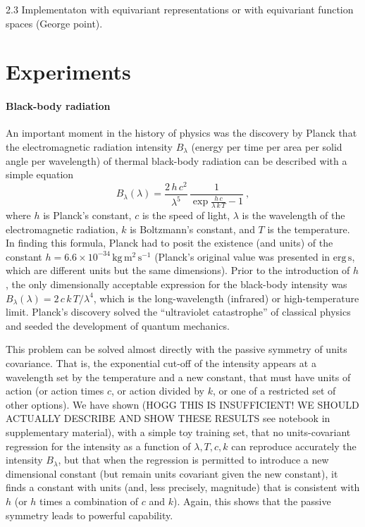 \documentclass{article}
\theoremstyle{plain}
\theoremstyle{definition}
\theoremstyle{remark}
\newcommand{\unit}[1]{\mathrm{#1}}
\newcommand{\kg}{\unit{kg}}
\newcommand{\m}{\unit{m}}
\newcommand{\s}{\unit{s}}
\begin{document}
   2.3 Implementaton with equivariant representations or with equivariant function spaces (George point).


\section{Experiments}\label{sec:experiments}

\paragraph{Black-body radiation}
An important moment in the history of physics was the discovery by Planck that the electromagnetic radiation intensity $B_\lambda$ (energy per time per area per solid angle per wavelength) of thermal black-body radiation can be described with a simple equation \cite{planck}
\begin{equation}
    B_\lambda(\lambda) = \frac{2\,h\,c^2}{\lambda^5}\,\frac{1}{\exp\frac{h\,c}{\lambda\,k\,T} - 1}~,
\end{equation}
where $h$ is Planck's constant,
$c$ is the speed of light,
$\lambda$ is the wavelength of the electromagnetic radiation,
$k$ is Boltzmann's constant,
and $T$ is the temperature.
In finding this formula, Planck had to posit the existence (and units) of the constant $h=6.6\times 10^{-34}\,\kg\,\m^2\,\s^{-1}$ (Planck's original value was presented in $\mathrm{erg}\,\s$, which are different units but the same dimensions).
Prior to the introduction of $h$, the only dimensionally acceptable expression for the black-body intensity was $B_\lambda(\lambda)=2\,c\,k\,T/\lambda^4$, which is the long-wavelength (infrared) or high-temperature limit.
Planck's discovery solved the ``ultraviolet catastrophe'' of classical physics and seeded the development of quantum mechanics.

This problem can be solved almost directly with the passive symmetry of units covariance.
That is, the exponential cut-off of the intensity appears at a wavelength set by the temperature and a new constant, that must have units of action (or action times $c$, or action divided by $k$, or one of a restricted set of other options).
We have shown (HOGG THIS IS INSUFFICIENT! WE SHOULD ACTUALLY DESCRIBE AND SHOW THESE RESULTS see notebook in supplementary material), with a simple toy training set, that no units-covariant regression for the intensity as a function of $\lambda, T, c, k$ can reproduce accurately the intensity $B_\lambda$, but that when the regression is permitted to introduce a new dimensional constant (but remain units covariant given the new constant), it finds a constant with units (and, less precisely, magnitude) that is consistent with $h$ (or $h$ times a combination of $c$ and $k$).
Again, this shows that the passive symmetry leads to powerful capability.
\end{document}
